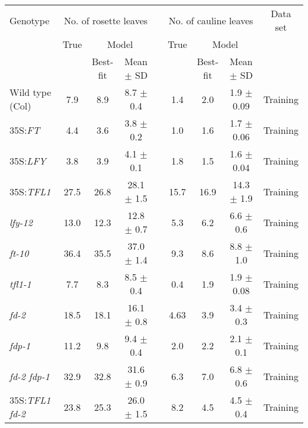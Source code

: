 \begin{table*}[!htb]
  \centering
  \setlength{\tabcolsep}{5pt}
  \begin{tabular}{@{}l@{\hspace{0.8em}}ccc@{\hspace{0.5em}}c@{\hspace{1.4em}}c@{\hspace{0.7em}}c@{\hspace{0.7em}}cc@{}}
    \toprule
    Genotype  & \multicolumn{3}{c}{ No. of rosette leaves} && \multicolumn{3}{c}{ No. of cauline leaves} & Data set \\
    \cmidrule(){2-4} \cmidrule(){6-8}
    & True & \multicolumn{2}{c}{Model} && True & \multicolumn{2}{c}{Model} & \\
    \cmidrule(){3-4} \cmidrule(){7-8}
    & & Best-fit & Mean $\pm$ SD &&& Best-fit & Mean $\pm$ SD \\
    \toprule
      Wild type (Col)             &  7.9  & 8.9  &  8.7 $ \pm $ 0.4 &&  1.4  & 2.0 &  1.9  $ \pm $  0.09 & Training\\
      35S:\emph{FT}               &  4.4  & 3.6  &  3.8 $ \pm $ 0.2 &&  1.0  & 1.6 &  1.7  $ \pm $  0.06 & Training\\
      35S:\emph{LFY}              &  3.8  & 3.9  &  4.1 $ \pm $ 0.1 &&  1.8  & 1.5 &  1.6  $ \pm $  0.04 & Training\\
      35S:\emph{TFL1}             & 27.5  & 26.8 & 28.1 $ \pm $ 1.5 && 15.7  & 16.9& 14.3  $ \pm $  1.9 & Training\\
      \emph{lfy-12}               & 13.0  & 12.3 & 12.8 $ \pm $ 0.7 &&  5.3  & 6.2 &  6.6  $ \pm $  0.6 & Training\\
      \emph{ft-10}                & 36.4  & 35.5 & 37.0 $ \pm $ 1.4 &&  9.3  & 8.6 &  8.8  $ \pm $  1.0 & Training\\
      \emph{tfl1-1}               &  7.7  & 8.3  &  8.5 $ \pm $ 0.4 &&  0.4  & 1.9 &  1.9  $ \pm $  0.08 & Training\\
      \emph{fd-2}                 & 18.5  & 18.1 & 16.1 $ \pm $ 0.8 &&  4.63 & 3.9 &  3.4  $ \pm $  0.3 & Training\\
      \emph{fdp-1}                & 11.2  & 9.8  &  9.4 $ \pm $ 0.4 &&  2.0  & 2.2 &  2.1  $ \pm $  0.1 & Training\\
      \emph{fd-2 fdp-1}           & 32.9  & 32.8 & 31.6 $ \pm $ 0.9 &&  6.3  & 7.0 &  6.8  $ \pm $  0.6 & Training\\
      35S:\emph{TFL1 fd-2}        & 23.8  & 25.3 & 26.0 $ \pm $ 1.5 &&  8.2  & 4.5 &  4.5  $ \pm $  0.4 & Training\\

\end{tabular}
\end{table*}
